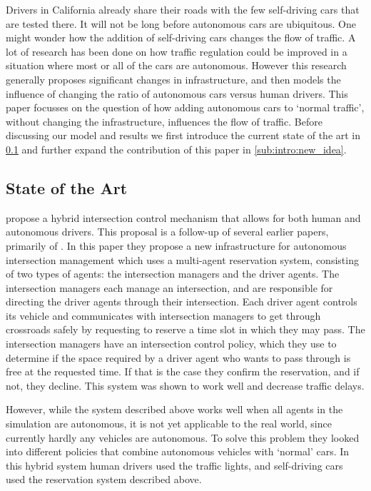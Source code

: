 Drivers in California already share their roads with the few self-driving cars that are tested there. It will not be long before autonomous cars are ubiquitous. One might wonder how the addition of self-driving cars changes the flow of traffic. A lot of research has been done on how traffic regulation could be improved in a situation where most or all of the cars are autonomous. However this research generally proposes significant changes in infrastructure, and then models the influence of changing the ratio of autonomous cars versus human drivers. This paper focusses on the question of how adding autonomous cars to `normal traffic', without changing the infrastructure, influences the flow of traffic. Before discussing our model and results we first introduce the current state of the art in \cref{sub:intro:state_of_the_art} and further expand the contribution of this paper in \cref{sub:intro:new_idea}.

\subsection{State of the Art}
\label{sub:intro:state_of_the_art}
\textcite{dresner2007sharing} propose a hybrid intersection control mechanism that allows for both human and autonomous drivers. This proposal is a follow-up of several earlier papers, primarily of \textcite{dresner2005traffic}. In this paper they propose a new infrastructure for autonomous intersection management which uses a multi-agent reservation system, consisting of two types of agents: the intersection managers and the driver agents. The intersection managers each manage an intersection, and are responsible for directing the driver agents through their intersection. Each driver agent controls its vehicle and communicates with intersection managers to get through crossroads safely by requesting to reserve a time slot in which they may pass. The intersection managers have an intersection control policy, which they use to determine if the space required by a driver agent who wants to pass through is free at the requested time. If that is the case they confirm the reservation, and if not, they decline. This system was shown to work well and decrease traffic delays. 

However, while the system described above works well when all agents in the simulation are autonomous, it is not yet applicable to the real world, since currently hardly any vehicles are autonomous. To solve this problem they looked into different policies that combine autonomous vehicles with `normal' cars. In this hybrid system human drivers used the traffic lights, and self-driving cars used the reservation system described above.

